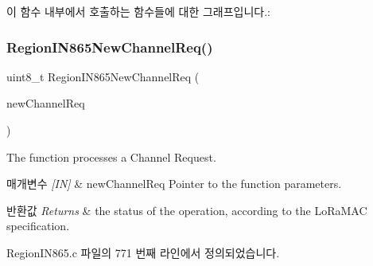 이 함수 내부에서 호출하는 함수들에 대한 그래프입니다.\+:
\mbox{\label{group___r_e_g_i_o_n_i_n865_ga5448e91593496677753ad6600cedadc5}} 
\subsubsection{\texorpdfstring{Region\+I\+N865\+New\+Channel\+Req()}{RegionIN865NewChannelReq()}}
{\footnotesize\ttfamily uint8\+\_\+t Region\+I\+N865\+New\+Channel\+Req (\begin{DoxyParamCaption}\item[{\mbox{\hyperlink{group___r_e_g_i_o_n_gae2abcdb6dbb843c9faf5fd3009eca9d6}{New\+Channel\+Req\+Params\+\_\+t}} $\ast$}]{new\+Channel\+Req }\end{DoxyParamCaption})}



The function processes a Channel Request. 


\begin{DoxyParams}{매개변수}
{\em \mbox{[}\+I\+N\mbox{]}} & new\+Channel\+Req Pointer to the function parameters.\\
\hline
\end{DoxyParams}

\begin{DoxyRetVals}{반환값}
{\em Returns} & the status of the operation, according to the Lo\+Ra\+M\+AC specification. \\
\hline
\end{DoxyRetVals}


Region\+I\+N865.\+c 파일의 771 번째 라인에서 정의되었습니다.


